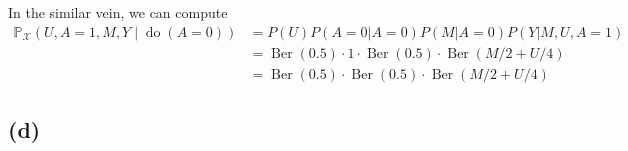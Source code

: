\documentclass[10pt]{article}
\begin{document}
In the similar vein, we can compute
\begin{align*}
    \mathbb{P}_{\mathcal{X}}(U, A=1, M, Y \mid \operatorname{do}(A=0)) &=  P(U)P(A=0|A=0)P(M|A=0)P(Y|M, U, A=1)\\
    &= \operatorname{Ber}(0.5)\cdot1\cdot\operatorname{Ber}(0.5)\cdot\operatorname{Ber}(M/2 + U/4)\\
    &= \operatorname{Ber}(0.5)\cdot\operatorname{Ber}(0.5)\cdot\operatorname{Ber}(M/2 + U/4)
\end{align*}    
        

\subsection{(d)}
\end{document}
